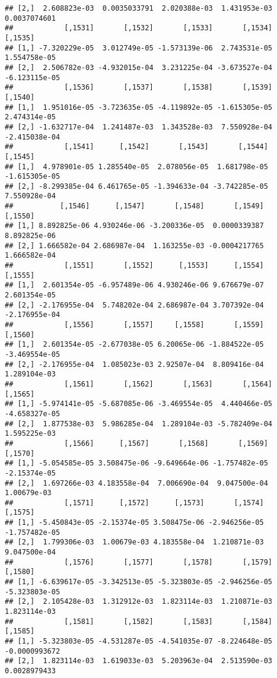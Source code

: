 \documentclass[
]{article}
\begin{document}
\begin{verbatim}
## [2,]  2.608823e-03  0.0035033791  2.020388e-03  1.431953e-03  0.0037074601
##            [,1531]       [,1532]       [,1533]       [,1534]       [,1535]
## [1,] -7.320229e-05  3.012749e-05 -1.573139e-06  2.743531e-05  1.554758e-05
## [2,]  2.506782e-03 -4.932015e-04  3.231225e-04 -3.673527e-04 -6.123115e-05
##            [,1536]       [,1537]       [,1538]       [,1539]       [,1540]
## [1,]  1.951016e-05 -3.723635e-05 -4.119892e-05 -1.615305e-05  2.474314e-05
## [2,] -1.632717e-04  1.241487e-03  1.343528e-03  7.550928e-04 -2.415038e-04
##            [,1541]      [,1542]       [,1543]       [,1544]       [,1545]
## [1,]  4.978901e-05 1.285540e-05  2.078056e-05  1.681798e-05 -1.615305e-05
## [2,] -8.299385e-04 6.461765e-05 -1.394633e-04 -3.742285e-05  7.550928e-04
##           [,1546]      [,1547]       [,1548]       [,1549]      [,1550]
## [1,] 8.892825e-06 4.930246e-06 -3.200336e-05  0.0000339387 8.892825e-06
## [2,] 1.666582e-04 2.686987e-04  1.163255e-03 -0.0004217765 1.666582e-04
##            [,1551]       [,1552]      [,1553]      [,1554]       [,1555]
## [1,]  2.601354e-05 -6.957489e-06 4.930246e-06 9.676679e-07  2.601354e-05
## [2,] -2.176955e-04  5.748202e-04 2.686987e-04 3.707392e-04 -2.176955e-04
##            [,1556]       [,1557]     [,1558]       [,1559]       [,1560]
## [1,]  2.601354e-05 -2.677038e-05 6.20065e-06 -1.884522e-05 -3.469554e-05
## [2,] -2.176955e-04  1.085023e-03 2.92507e-04  8.809416e-04  1.289104e-03
##            [,1561]       [,1562]       [,1563]       [,1564]       [,1565]
## [1,] -5.974141e-05 -5.687085e-06 -3.469554e-05  4.440466e-05 -4.658327e-05
## [2,]  1.877538e-03  5.986285e-04  1.289104e-03 -5.782409e-04  1.595225e-03
##            [,1566]      [,1567]       [,1568]       [,1569]      [,1570]
## [1,] -5.054585e-05 3.508475e-06 -9.649664e-06 -1.757482e-05 -2.15374e-05
## [2,]  1.697266e-03 4.183558e-04  7.006690e-04  9.047500e-04  1.00679e-03
##            [,1571]      [,1572]      [,1573]       [,1574]       [,1575]
## [1,] -5.450843e-05 -2.15374e-05 3.508475e-06 -2.946256e-05 -1.757482e-05
## [2,]  1.799306e-03  1.00679e-03 4.183558e-04  1.210871e-03  9.047500e-04
##            [,1576]       [,1577]       [,1578]       [,1579]       [,1580]
## [1,] -6.639617e-05 -3.342513e-05 -5.323803e-05 -2.946256e-05 -5.323803e-05
## [2,]  2.105428e-03  1.312912e-03  1.823114e-03  1.210871e-03  1.823114e-03
##            [,1581]       [,1582]       [,1583]       [,1584]       [,1585]
## [1,] -5.323803e-05 -4.531287e-05 -4.541035e-07 -8.224648e-05 -0.0000993672
## [2,]  1.823114e-03  1.619033e-03  5.203963e-04  2.513590e-03  0.0028979433

\end{verbatim}
\end{document}
